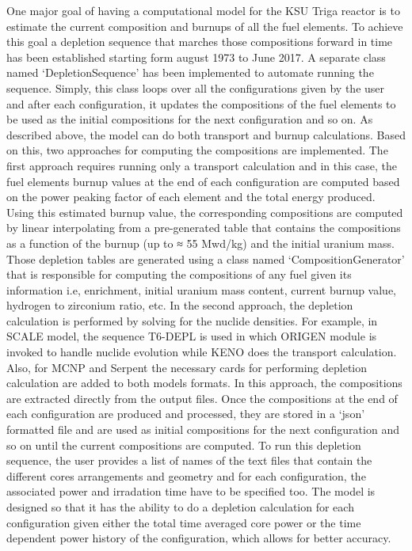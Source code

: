 \documentclass[review]{elsarticle}
\begin{document}
One major goal of having a computational model for the KSU Triga reactor is to estimate the current composition and burnups of all the fuel elements. To achieve this goal a depletion sequence that marches those compositions forward in time has been established starting form august 1973 to June 2017.
A separate class named `DepletionSequence' has been implemented to automate running the sequence. Simply, this class loops over all the configurations given by the user and after each configuration, it updates the compositions of the fuel elements to be used as the initial compositions for the next configuration and so on. 
As described above, the model can do both transport and burnup calculations. Based on this, two approaches for computing the compositions are implemented. The first approach requires running only a transport calculation and in this case, the fuel elements burnup values at the end of each configuration are computed based on the power peaking factor of each element and the total energy produced. Using this estimated burnup value, the corresponding compositions are
computed by linear interpolating from a pre-generated table that contains the compositions as
a function of the burnup (up to ≈ 55 Mwd/kg) and the initial uranium mass. Those depletion
tables are generated using a class named ‘CompositionGenerator’ that is responsible for computing
the compositions of any fuel given its information i.e, enrichment, initial uranium mass
content, current burnup value, hydrogen to zirconium ratio, etc.
In the second approach, the depletion calculation is performed by solving for the nuclide densities. For example, in SCALE model, the sequence T6-DEPL is used in which ORIGEN module is
invoked to handle nuclide evolution while KENO does the transport calculation. Also, for MCNP
and Serpent the necessary cards for performing depletion calculation are added to both models
formats. In this approach, the compositions are extracted directly from the output files. Once the
compositions at the end of each configuration are produced and processed, they are stored in a
‘json’ formatted file and are used as initial compositions for the next configuration and so on until
the current compositions are computed.
To run this depletion sequence, the user provides a list of names of the text files that contain the different cores arrangements and geometry and for each configuration, the associated power and
irradation time have to be specified too. The model is designed so that it has the ability to do a
depletion calculation for each configuration given either the total time averaged core power or the
time dependent power history of the configuration, which allows for better accuracy.
\end{document}
